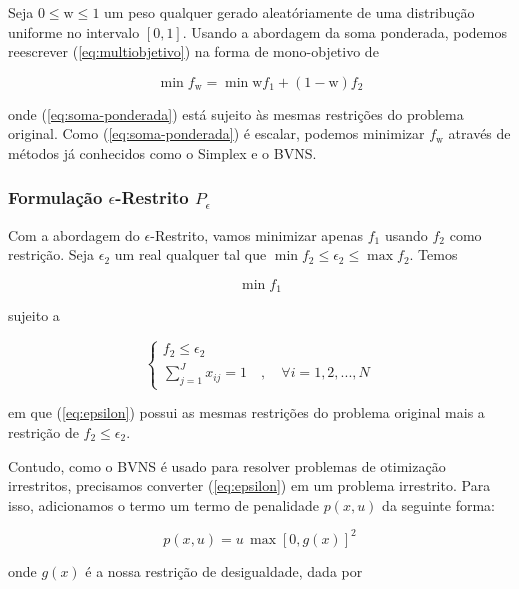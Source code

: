 \documentclass[conference]{IEEEtran}
\begin{document}
Seja $0 \leq \mathrm{w} \leq 1$ um peso qualquer gerado aleatóriamente de uma distribução 
uniforme no intervalo $[0, 1]$. Usando a abordagem da soma ponderada, podemos reescrever 
(\ref{eq:multiobjetivo}) na forma de mono-objetivo de

\begin{equation} \label{eq:soma-ponderada}
	\min f_{\mathrm{w}} = \min \mathrm{w}f_1 + (1-\mathrm{w})f_2
\end{equation}

\noindent onde (\ref{eq:soma-ponderada}) está sujeito às mesmas restrições 
do problema original. Como (\ref{eq:soma-ponderada}) é escalar, podemos 
minimizar $f_{\mathrm{w}}$ através de métodos já conhecidos como o Simplex e o 
BVNS. 

\subsubsection{Formulação $\epsilon$-Restrito $P_{\epsilon}$}

Com a abordagem do $\epsilon$-Restrito, vamos minimizar apenas $f_1$ 
usando $f_2$ como restrição. Seja $\epsilon_2$ um real qualquer tal que  $\min f_2 \leq \epsilon_2 \leq \max f_2$.
Temos 

\begin{equation}\label{eq:epsilon}
	\min f_1
\end{equation}

\noindent sujeito a 

\begin{equation} \label{eq:rest-epsilon}
    \begin{cases}
      f_2 \leq \epsilon_2 \\
      \sum_{j=1}^{J} x_{ij} = 1 \quad , \quad \forall i = {1, 2, ..., N}
    \end{cases}       
\end{equation}

\noindent em que (\ref{eq:epsilon}) possui as mesmas restrições do problema original
mais a restrição de $f_2 \leq \epsilon_2$.

Contudo, como o BVNS é usado para resolver problemas de otimização irrestritos, 
precisamos converter (\ref{eq:epsilon}) em um problema irrestrito. Para isso, adicionamos o 
termo um termo de penalidade $p(x, u)$ da seguinte forma:

\[ p(x, u) = u \, \max \left[ 0, g(x) \right] ^2 \]

\noindent onde $g(x)$ é a nossa restrição de desigualdade, dada por 
\end{document}
